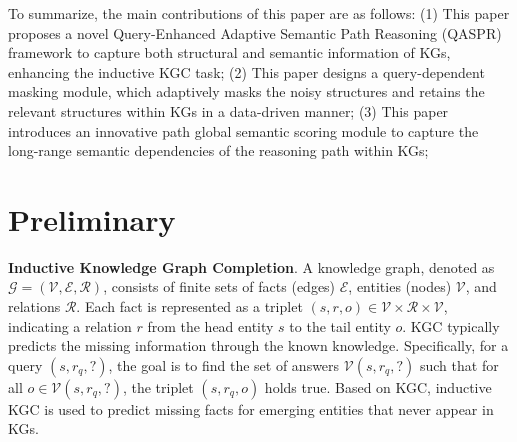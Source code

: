 \documentclass[sigconf]{acmart}
\begin{document}
To summarize, the main contributions of this paper are as follows: (1) This paper proposes a novel Query-Enhanced Adaptive Semantic Path Reasoning (QASPR) framework to capture both structural and semantic information of KGs, enhancing the inductive KGC task; (2) This paper designs a query-dependent masking module, which adaptively masks the noisy structures and retains the relevant structures within KGs in a data-driven manner; (3) This paper introduces an innovative path global semantic scoring module to capture the long-range semantic
dependencies of the reasoning path within KGs; 


\section{Preliminary}
\textbf{Inductive Knowledge Graph Completion}. A knowledge graph, denoted as $\mathcal{G} = (\mathcal{V}, \mathcal{E}, \mathcal{R})$, consists of finite sets of facts (edges) $\mathcal{E}$, entities (nodes) $\mathcal{V}$, and relations  $\mathcal{R}$. Each fact is represented as a triplet $(s, r, o) \in \mathcal{V} \times \mathcal{R} \times \mathcal{V}$, indicating a relation $r$ from the head entity $s$ to the tail entity $o$. KGC typically predicts the missing information through the known knowledge. Specifically, for a query $(s, r_q, ?)$, the goal is to find the set of answers $\mathcal{V}{(s,r_q,?)}$ such that for all $o \in \mathcal{V}{(s,r_q,?)}$, the triplet $(s, r_q, o)$ holds true. Based on KGC, inductive KGC is used to predict missing facts for emerging entities that never appear in KGs. %
\end{document}
